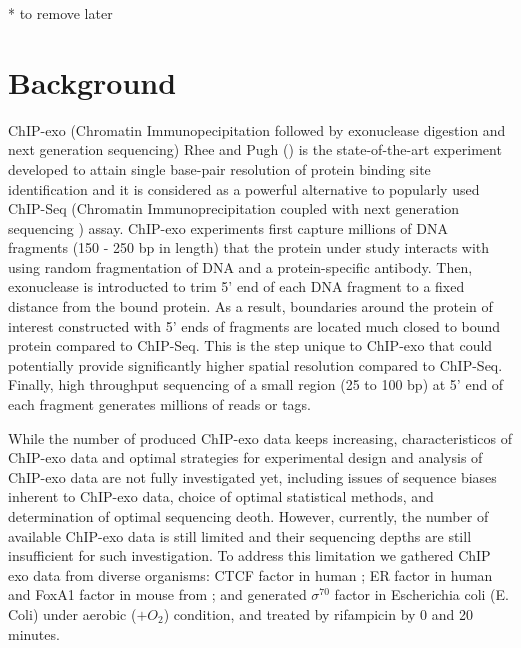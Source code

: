 \documentclass{bmcart}\usepackage[]{graphicx}\usepackage[]{color}
\begin{document}
\newpage

* to remove later

\tableofcontents


\newpage


\section{Background}
\label{sec:intro}

ChIP-exo (Chromatin Immunopecipitation followed by exonuclease
digestion and next generation sequencing) Rhee and Pugh (\cite{exo1})
is the state-of-the-art experiment developed to attain single
base-pair resolution of protein binding site identification and it is
considered as a powerful alternative to popularly used ChIP-Seq
(Chromatin Immunoprecipitation coupled with next generation sequencing
) assay. ChIP-exo experiments first capture millions of DNA fragments
(150 - 250 bp in length) that the protein under study interacts with
using random fragmentation of DNA and a protein-specific
antibody. Then, exonuclease is introducted to trim 5' end of each DNA
fragment to a fixed distance from the bound protein. As a result,
boundaries around the protein of interest constructed with 5' ends of
fragments are located much closed to bound protein compared to
ChIP-Seq. This is the step unique to ChIP-exo that could potentially
provide significantly higher spatial resolution compared to
ChIP-Seq. Finally, high throughput sequencing of a small region (25 to
100 bp) at 5' end of each fragment generates millions of reads or
tags.

While the number of produced ChIP-exo data keeps increasing,
characteristicos of ChIP-exo data and optimal strategies for
experimental design and analysis of ChIP-exo data are not fully
investigated yet, including issues of sequence biases inherent to
ChIP-exo data, choice of optimal statistical methods, and
determination of optimal sequencing deoth. However, currently, the
number of available ChIP-exo data is still limited and their
sequencing depths are still insufficient for such investigation. To
address this limitation we gathered ChIP exo data from diverse
organisms: CTCF factor in human \cite{exo1}; ER factor in human and
FoxA1 factor in mouse from \cite{exoillumina}; and generated
$\sigma^{70}$ factor in Escherichia coli (E. Coli) under aerobic ($ +
O_2$) condition, and treated by rifampicin by 0 and 20 minutes.
\end{document}
